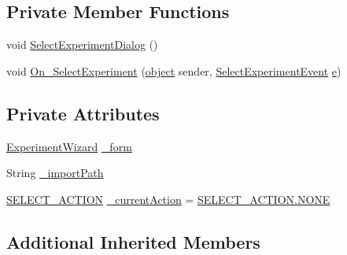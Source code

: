 \subsection*{Private Member Functions}
\begin{DoxyCompactItemize}
\item 
void \hyperlink{class_web_analyzer_1_1_u_i_1_1_interaction_objects_1_1_experiment_wizard_obj_a4a69da48d96c3f49f78ab58ff1f608f8}{Select\+Experiment\+Dialog} ()
\item 
void \hyperlink{class_web_analyzer_1_1_u_i_1_1_interaction_objects_1_1_experiment_wizard_obj_a5c7f45e1b85d3eaa1f2c78e650a64012}{On\+\_\+\+Select\+Experiment} (\hyperlink{_u_i_2_h_t_m_l_resources_2js_2lib_2underscore_8min_8js_aae18b7515bb2bc4137586506e7c0c903}{object} sender, \hyperlink{class_web_analyzer_1_1_events_1_1_select_experiment_event}{Select\+Experiment\+Event} \hyperlink{_u_i_2_h_t_m_l_resources_2js_2lib_2bootstrap_8min_8js_ab5902775854a8b8440bcd25e0fe1c120}{e})
\end{DoxyCompactItemize}
\subsection*{Private Attributes}
\begin{DoxyCompactItemize}
\item 
\hyperlink{class_web_analyzer_1_1_u_i_1_1_experiment_wizard}{Experiment\+Wizard} \hyperlink{class_web_analyzer_1_1_u_i_1_1_interaction_objects_1_1_experiment_wizard_obj_a28ba1f710b9aa6bc477784dc03994b75}{\+\_\+form}
\item 
String \hyperlink{class_web_analyzer_1_1_u_i_1_1_interaction_objects_1_1_experiment_wizard_obj_ac39fd1cef0cdfe82f059db09b97cc0f2}{\+\_\+import\+Path}
\item 
\hyperlink{class_web_analyzer_1_1_u_i_1_1_interaction_objects_1_1_experiment_wizard_obj_a8d68b0ff79197613c58d75f6323bb6ba}{S\+E\+L\+E\+C\+T\+\_\+\+A\+C\+T\+I\+O\+N} \hyperlink{class_web_analyzer_1_1_u_i_1_1_interaction_objects_1_1_experiment_wizard_obj_a2b5cdca2be4cecb230b3107d69ddd322}{\+\_\+current\+Action} = \hyperlink{class_web_analyzer_1_1_u_i_1_1_interaction_objects_1_1_experiment_wizard_obj_a8d68b0ff79197613c58d75f6323bb6baab50339a10e1de285ac99d4c3990b8693}{S\+E\+L\+E\+C\+T\+\_\+\+A\+C\+T\+I\+O\+N.\+N\+O\+N\+E}
\end{DoxyCompactItemize}
\subsection*{Additional Inherited Members}


